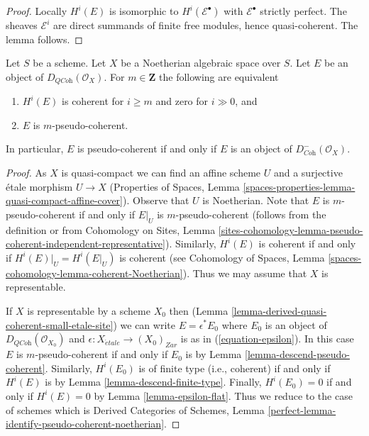\begin{proof}
Locally $H^i(E)$ is isomorphic to $H^i(\mathcal{E}^\bullet)$
with $\mathcal{E}^\bullet$ strictly perfect. The sheaves
$\mathcal{E}^i$ are direct summands of finite free modules,
hence quasi-coherent. The lemma follows.
\end{proof}

\begin{lemma}
\label{lemma-identify-pseudo-coherent-noetherian}
Let $S$ be a scheme. Let $X$ be a Noetherian algebraic space over $S$.
Let $E$ be an object of $D_{\textit{QCoh}}(\mathcal{O}_X)$. For
$m \in \mathbf{Z}$ the following are equivalent
\begin{enumerate}
\item $H^i(E)$ is coherent for $i \geq m$ and zero for $i \gg 0$, and
\item $E$ is $m$-pseudo-coherent.
\end{enumerate}
In particular, $E$ is pseudo-coherent if and only if $E$ is an object
of $D^-_{\textit{Coh}}(\mathcal{O}_X)$.
\end{lemma}

\begin{proof}
As $X$ is quasi-compact we can find an affine scheme $U$ and a surjective
\'etale morphism $U \to X$ (Properties of Spaces, Lemma
\ref{spaces-properties-lemma-quasi-compact-affine-cover}).
Observe that $U$ is Noetherian.
Note that $E$ is $m$-pseudo-coherent if and only if $E|_U$ is
$m$-pseudo-coherent (follows from the definition or from
Cohomology on Sites, Lemma
\ref{sites-cohomology-lemma-pseudo-coherent-independent-representative}).
Similarly, $H^i(E)$ is coherent if and only if $H^i(E)|_U = H^i(E|_U)$
is coherent (see Cohomology of Spaces, Lemma
\ref{spaces-cohomology-lemma-coherent-Noetherian}).
Thus we may assume that $X$ is representable.

\medskip\noindent
If $X$ is representable by a scheme $X_0$ then
(Lemma \ref{lemma-derived-quasi-coherent-small-etale-site})
we can write $E = \epsilon^*E_0$ where $E_0$ is an object of
$D_{\textit{QCoh}}(\mathcal{O}_{X_0})$ and
$\epsilon : X_{\acute{e}tale} \to (X_0)_{Zar}$ is as in
(\ref{equation-epsilon}).
In this case $E$ is $m$-pseudo-coherent
if and only if $E_0$ is by Lemma \ref{lemma-descend-pseudo-coherent}.
Similarly, $H^i(E_0)$ is of finite type (i.e., coherent) if and only if
$H^i(E)$ is by Lemma \ref{lemma-descend-finite-type}.
Finally, $H^i(E_0) = 0$ if and only if $H^i(E) = 0$ by
Lemma \ref{lemma-epsilon-flat}.
Thus we reduce to the case of schemes which is
Derived Categories of Schemes, Lemma
\ref{perfect-lemma-identify-pseudo-coherent-noetherian}.
\end{proof}

